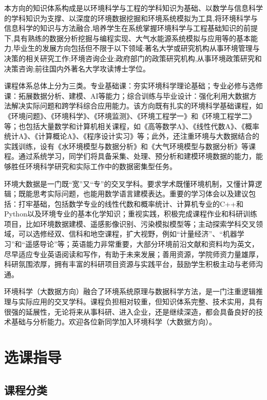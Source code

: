 \documentclass[11pt,oneside]{book}
\begin{document}
本方向的知识体系构成是以环境科学与工程的学科知识为基础、以数学与信息科学的学科知识为支撑、以深度的环境数据挖掘和环境系统模拟为工具,将环境科学与信息科学的知识与方法融合,培养学生在系统掌握环境科学与工程基础知识的前提下,具有熟练的数据分析挖掘与编程实现、大气水能源系统模拟与应用等的基本能力,毕业生的发展方向包括但不限于以下领域:著名大学或研究机构从事环境管理与决策的相关研究工作;环境咨询企业;政府部门的政策研究机构,从事环境政策研究和决策咨询;前往国内外著名大学攻读博士学位。

课程体系总体上分为三类。专业基础课：夯实环境科学理论基础；专业必修与选修课：拓展数据分析、建模、AI等能力；综合训练与毕业设计：强化利用大数据方法解决实际问题和跨学科综合应用能力。该方向既有扎实的环境科学基础课程，如《环境问题》、《环境科学》、《环境监测》、《环境工程学一》和《环境工程学二》等；也包括大量数学和计算机相关课程，如《高等数学A》、《线性代数A》、《概率统计A》、《计算概论A》、《程序设计实习》等；此外，还注重环境与大数据结合的实践训练，设有《水环境模型与数据分析》和《大气环境模型与数据分析》等课程。通过系统学习，同学们将具备采集、处理、预分析和建模环境数据的能力，能够胜任环境科学研究和实际工作中的数据密集型任务。

环境大数据是一门既“宽”又“专”的交叉学科。要求学术既懂环境机制，又懂计算逻辑；既能思考实际问题，也能用数学语言建模表达。重要的学习体会以及建议包括：打牢基础，包括数学专业的线性代数和概率统计、计算机专业的C++和Python以及环境专业的基本化学知识；重视实践，积极完成课程作业和科研训练项目，比如环境数据建模、遥感影像识别、污染模拟模型等；主动探索学科交叉领域，可以选修经双、信科和地空课程，扩大视野，例如“计量经济”、“机器学习”和“遥感导论”等；英语能力非常重要，大部分环境前沿文献和资料均为英文，尽早适应专业英语阅读和写作，有助于未来发展；善用资源，学院师资力量雄厚，科研氛围浓厚，拥有丰富的科研项目资源与实践平台，鼓励学生积极主动与老师沟通。

环境科学（大数据方向）融合了环境系统原理与数据科学方法，是一门注重逻辑推理与实际应用的交叉学科。课程负担相对较重，但知识体系完整、技术实用，具有很强的延展性，无论将来从事科研、进入企业，还是继续深造，都会具备良好的技术基础与分析能力。欢迎各位新同学加入环境科学（大数据方向）。








\chapter{选课指导}
\section{课程分类}
\end{document}

